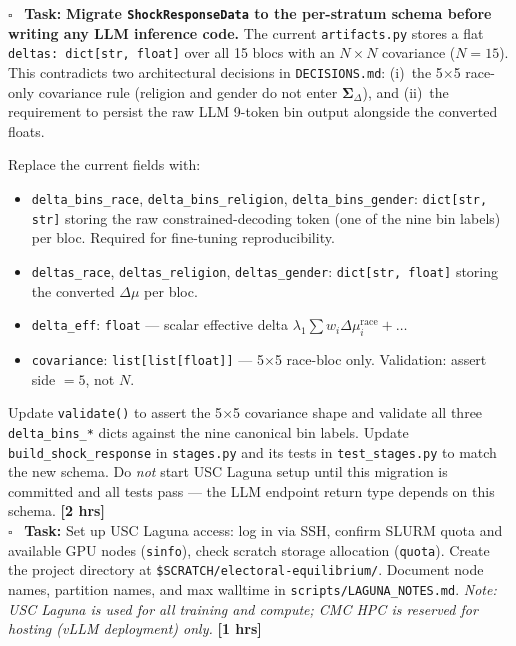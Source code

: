 \documentclass[11pt]{article}
\newcommand{\hrs}[1]{\textbf{[#1 hrs]}}
\newcommand{\boldSigma}{\boldsymbol{\Sigma}}
\newcommand{\task}[2]{%
  \noindent\textbf{Task:} #1 \hfill \hrs{#2}\\}
\newcommand{\done}{\textcolor{sectionblue}{$\square$}\ }
\begin{document}
\begin{taskbox}
\done \task{\textbf{Migrate \texttt{ShockResponseData} to the per-stratum schema
  before writing any LLM inference code.}
  The current \texttt{artifacts.py} stores a flat \texttt{deltas: dict[str,
  float]} over all 15 blocs with an $N \times N$ covariance ($N = 15$).
  This contradicts two architectural decisions in \texttt{DECISIONS.md}:
  (i)~the 5$\times$5 race-only covariance rule (religion and gender do not
  enter $\boldSigma_\Delta$), and (ii)~the requirement to persist the raw
  LLM 9-token bin output alongside the converted floats.

  Replace the current fields with:
  \begin{itemize}[leftmargin=1.6em, itemsep=1pt]
    \item \texttt{delta\_bins\_race}, \texttt{delta\_bins\_religion},
          \texttt{delta\_bins\_gender}: \texttt{dict[str, str]} storing the
          raw constrained-decoding token (one of the nine bin labels) per bloc.
          Required for fine-tuning reproducibility.
    \item \texttt{deltas\_race}, \texttt{deltas\_religion},
          \texttt{deltas\_gender}: \texttt{dict[str, float]} storing the
          converted $\Delta\mu$ per bloc.
    \item \texttt{delta\_eff}: \texttt{float} --- scalar effective delta
          $\lambda_1\sum w_i\Delta\mu_i^{\text{race}} + \ldots$
    \item \texttt{covariance}: \texttt{list[list[float]]} --- 5$\times$5
          race-bloc only. Validation: assert side $= 5$, not $N$.
  \end{itemize}

  Update \texttt{validate()} to assert the 5$\times$5 covariance shape and
  validate all three \texttt{delta\_bins\_*} dicts against the nine canonical
  bin labels. Update \texttt{build\_shock\_response} in \texttt{stages.py}
  and its tests in \texttt{test\_stages.py} to match the new schema.
  Do \emph{not} start USC Laguna setup until this migration is committed and all
  tests pass --- the LLM endpoint return type depends on this schema.}{2}

\done \task{Set up USC Laguna access: log in via SSH, confirm SLURM quota and
  available GPU nodes (\texttt{sinfo}), check scratch storage allocation
  (\texttt{quota}). Create the project directory at
  \texttt{\$SCRATCH/electoral-equilibrium/}. Document node names, partition
  names, and max walltime in \texttt{scripts/LAGUNA\_NOTES.md}.
  \emph{Note: USC Laguna is used for all training and compute; CMC HPC is
  reserved for hosting (vLLM deployment) only.}}{1}


\end{taskbox}
\end{document}
